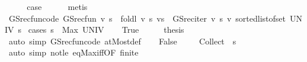 \begin{isabellebody}
\ \ \isamarkupfalse%
\ \isamarkupfalse%
\ {\isacharquery}{\kern0pt}case\isanewline
\ \ \ \ \isamarkupfalse%
\ metis\isanewline
{}\isamarkupfalse%
%
\endisatagproof
{\isafoldproof}%
%
\isadelimproof
\isanewline
%
\endisadelimproof
\isanewline
{}\isamarkupfalse%
\ GS{\isacharunderscore}{\kern0pt}rec{\isacharunderscore}{\kern0pt}fun{\isacharunderscore}{\kern0pt}code{\isacharprime}{\kern0pt}{\isacharcolon}{\kern0pt}\ {\isachardoublequoteopen}GS{\isacharunderscore}{\kern0pt}rec{\isacharunderscore}{\kern0pt}fun\ v\ s\ {\isacharequal}{\kern0pt}\ foldl\ {\isacharparenleft}{\kern0pt}{\isasymlambda}v\ s{\isachardot}{\kern0pt}\ v{\isacharparenleft}{\kern0pt}s\ {\isacharcolon}{\kern0pt}{\isacharequal}{\kern0pt}\ GS{\isacharunderscore}{\kern0pt}rec{\isacharunderscore}{\kern0pt}iter\ v\ s{\isacharparenright}{\kern0pt}{\isacharparenright}{\kern0pt}\ v\ {\isacharparenleft}{\kern0pt}sorted{\isacharunderscore}{\kern0pt}list{\isacharunderscore}{\kern0pt}of{\isacharunderscore}{\kern0pt}set\ UNIV{\isacharparenright}{\kern0pt}\ s{\isachardoublequoteclose}\isanewline
%
\isadelimproof
%
\endisadelimproof
%
\isatagproof
{}\isamarkupfalse%
\ {\isacharparenleft}{\kern0pt}cases\ {\isachardoublequoteopen}s\ {\isacharequal}{\kern0pt}\ Max\ UNIV{\isachardoublequoteclose}{\isacharparenright}{\kern0pt}\isanewline
\ \ \isamarkupfalse%
\ True\isanewline
\ \ \isamarkupfalse%
\ \isamarkupfalse%
\ {\isacharquery}{\kern0pt}thesis\ \isanewline
\ \ \ \ \isamarkupfalse%
\ {\isacharparenleft}{\kern0pt}auto\ simp{\isacharcolon}{\kern0pt}\ GS{\isacharunderscore}{\kern0pt}rec{\isacharunderscore}{\kern0pt}fun{\isacharunderscore}{\kern0pt}code\ atMost{\isacharunderscore}{\kern0pt}def{\isacharparenright}{\kern0pt}\isanewline
{}\isamarkupfalse%
\isanewline
\ \ \isamarkupfalse%
\ False\isanewline
\ \ \isamarkupfalse%
\ {\isacharasterisk}{\kern0pt}{\isacharcolon}{\kern0pt}\ {\isachardoublequoteopen}{\isacharparenleft}{\kern0pt}Collect\ {\isacharparenleft}{\kern0pt}{\isacharparenleft}{\kern0pt}{\isacharless}{\kern0pt}{\isacharparenright}{\kern0pt}\ s{\isacharparenright}{\kern0pt}{\isacharparenright}{\kern0pt}\ {\isasymnoteq}\ {\isacharbraceleft}{\kern0pt}{\isacharbraceright}{\kern0pt}{\isachardoublequoteclose}\isanewline
\ \ \ \ \isamarkupfalse%
\ {\isacharparenleft}{\kern0pt}auto\ simp{\isacharcolon}{\kern0pt}\ not{\isacharunderscore}{\kern0pt}le\ eq{\isacharunderscore}{\kern0pt}Max{\isacharunderscore}{\kern0pt}iff{\isacharbrackleft}{\kern0pt}OF\ finite{\isacharbrackright}{\kern0pt}{\isacharparenright}{\kern0pt}\isanewline

\end{isabellebody}
